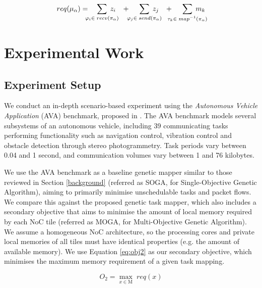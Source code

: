 \documentclass[conference]{IEEEtran}
\begin{document}
	\begin{equation}
		req(\mu_\alpha) =
		\phantom{...} \sum_{\mathclap{\varphi_i \in \phantom{.}recv(\pi_\alpha)}}\phantom{.} z_i
		\phantom{...}+\phantom{....} \sum_{\mathclap{\varphi_j \in \phantom{.}send(\pi_\alpha)}} \phantom{.} z_j
		\phantom{...}+\phantom{....} \sum_{\mathclap{\tau_k \in \phantom{.}map^{-1}(\pi_\alpha)}}\phantom{.} m_k
	\end{equation}
\vspace{0.4ex}
\section{Experimental Work}\label{experimental_work}

\subsection{Experiment Setup}\label{experiment_setup}

We conduct an in-depth scenario-based experiment using the \textit{Autonomous Vehicle Application} (AVA) benchmark, proposed in \cite{shi2010schedulability}. The AVA benchmark models several subsystems of an autonomous vehicle, including 39 communicating tasks performing functionality such as navigation control, vibration control and obstacle detection through stereo photogrammetry. Task periods vary between 0.04 and 1 second, and communication volumes vary between 1 and 76 kilobytes.

We use the AVA benchmark as a baseline genetic mapper similar to those reviewed in Section \ref{background} (referred as SOGA, for Single-Objective Genetic Algorithm), aiming to primarily minimise unschedulable tasks and packet flows. We compare this against the proposed genetic task mapper, which also includes a secondary objective that aims to minimise the amount of local memory required by each NoC tile (referred as MOGA, for Multi-Objective Genetic Algorithm). We assume a homogeneous NoC architecture, so the processing cores and private local memories of all tiles must have identical properties (e.g. the amount of available memory). We use Equation \ref{eq:obj2} as our secondary objective, which minimises the maximum memory requirement of a given task mapping.
\vspace{-1ex}

	\begin{equation}
		O_2 = \max_{x \in \mathrm{M}}\phantom{.}{req(x)}
		\label{eq:obj2}
	\end{equation}
\end{document}
